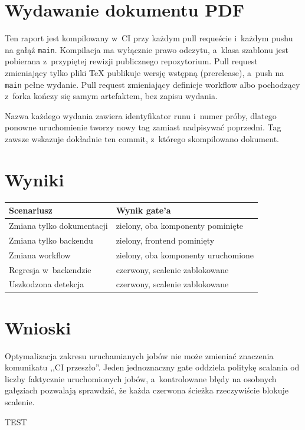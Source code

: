 \documentclass{sprz}
\begin{document}
\section{Wydawanie dokumentu PDF}

Ten raport jest kompilowany w~CI przy każdym pull requeście i~każdym pushu na
gałąź \texttt{main}. Kompilacja ma wyłącznie prawo odczytu, a~klasa szablonu
jest pobierana z~przypiętej rewizji publicznego repozytorium. Pull request
zmieniający tylko pliki TeX publikuje wersję wstępną (prerelease), a~push na
\texttt{main} pełne wydanie. Pull request zmieniający definicje workflow albo
pochodzący z~forka kończy się samym artefaktem, bez zapisu wydania.

Nazwa każdego wydania zawiera identyfikator runu i~numer próby, dlatego
ponowne uruchomienie tworzy nowy tag zamiast nadpisywać poprzedni. Tag zawsze
wskazuje dokładnie ten commit, z~którego skompilowano dokument.

\section{Wyniki}

\begin{tabular}{|l|l|}
\hline
\textbf{Scenariusz} & \textbf{Wynik gate'a} \\
\hline
Zmiana tylko dokumentacji & zielony, oba komponenty pominięte \\
Zmiana tylko backendu & zielony, frontend pominięty \\
Zmiana workflow & zielony, oba komponenty uruchomione \\
Regresja w~backendzie & czerwony, scalenie zablokowane \\
Uszkodzona detekcja & czerwony, scalenie zablokowane \\
\hline
\end{tabular}

\section{Wnioski}

Optymalizacja zakresu uruchamianych jobów nie może zmieniać znaczenia
komunikatu ,,CI przeszło''. Jeden jednoznaczny gate oddziela politykę scalania
od liczby faktycznie uruchomionych jobów, a~kontrolowane błędy na osobnych
gałęziach pozwalają sprawdzić, że każda czerwona ścieżka rzeczywiście blokuje
scalenie.

TEST
\end{document}
